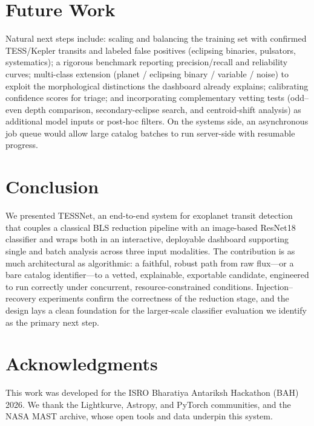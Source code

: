 \documentclass[twocolumn,10pt]{article}
\begin{document}
\section{Future Work}
Natural next steps include: scaling and balancing the training set with confirmed
TESS/Kepler transits and labeled false positives (eclipsing binaries, pulsators,
systematics); a rigorous benchmark reporting precision/recall and reliability
curves; multi-class extension (planet / eclipsing binary / variable / noise) to
exploit the morphological distinctions the dashboard already explains; calibrating
confidence scores for triage; and incorporating complementary vetting tests (odd--
even depth comparison, secondary-eclipse search, and centroid-shift analysis) as
additional model inputs or post-hoc filters. On the systems side, an
asynchronous job queue would allow large catalog batches to run server-side with
resumable progress.

\section{Conclusion}
We presented TESSNet, an end-to-end system for exoplanet transit detection that
couples a classical BLS reduction pipeline with an image-based ResNet18 classifier
and wraps both in an interactive, deployable dashboard supporting single and batch
analysis across three input modalities. The contribution is as much architectural
as algorithmic: a faithful, robust path from raw flux---or a bare catalog
identifier---to a vetted, explainable, exportable candidate, engineered to run
correctly under concurrent, resource-constrained conditions. Injection--recovery
experiments confirm the correctness of the reduction stage, and the design lays a
clean foundation for the larger-scale classifier evaluation we identify as the
primary next step.

\section*{Acknowledgments}
This work was developed for the ISRO Bharatiya Antariksh Hackathon (BAH) 2026. We
thank the Lightkurve, Astropy, and PyTorch communities, and the NASA MAST archive,
whose open tools and data underpin this system.
\end{document}
